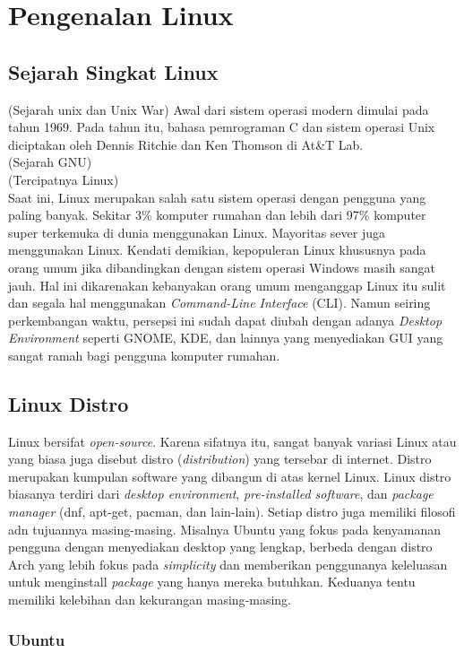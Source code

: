 \chapter{Pengenalan Linux}

\section{Sejarah Singkat Linux}
(Sejarah unix dan Unix War) Awal dari sistem operasi modern dimulai pada tahun 1969. Pada tahun itu, bahasa pemrograman C dan sistem operasi Unix diciptakan oleh Dennis Ritchie dan Ken Thomson di At\&T Lab. \\ 

(Sejarah GNU) \\ 

(Tercipatnya Linux) \\ 

Saat ini, Linux merupakan salah satu sistem operasi dengan pengguna yang paling banyak. Sekitar 3\% komputer rumahan dan lebih dari 97\% komputer super terkemuka di dunia menggunakan Linux. Mayoritas sever juga menggunakan Linux. Kendati demikian, kepopuleran Linux khususnya pada orang umum jika dibandingkan dengan sistem operasi Windows masih sangat jauh. Hal ini dikarenakan kebanyakan orang umum menganggap Linux itu sulit dan segala hal menggunakan \textit{Command-Line Interface} (CLI). Namun seiring perkembangan waktu, persepsi ini sudah dapat diubah dengan adanya \textit{Desktop Environment} seperti GNOME, KDE, dan lainnya yang menyediakan GUI yang sangat ramah bagi pengguna komputer rumahan.\\

\section{Linux Distro}
Linux bersifat \textit{open-source}. Karena sifatnya itu, sangat banyak variasi Linux atau yang biasa juga disebut distro (\textit{distribution}) yang tersebar di internet. Distro merupakan kumpulan software yang dibangun di atas kernel Linux. Linux distro biasanya terdiri dari \textit{desktop environment}, \textit{pre-installed software}, dan \textit{package manager} (dnf, apt-get, pacman, dan lain-lain). Setiap distro juga memiliki filosofi adn tujuannya masing-masing. Misalnya Ubuntu yang fokus pada kenyamanan pengguna dengan menyediakan desktop yang lengkap, berbeda dengan distro Arch yang lebih fokus pada \textit{simplicity} dan memberikan penggunanya keleluasan untuk menginstall \textit{package} yang hanya mereka butuhkan. Keduanya tentu memiliki kelebihan dan kekurangan masing-masing. 

\subsection{Ubuntu}
